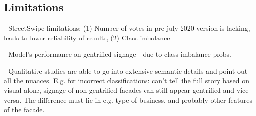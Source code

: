\subsection{Limitations}
- StreetSwipe limitations: (1) Number of votes in pre-july 2020 version is lacking, leads to lower reliability of results, (2) Class imbalance

- Model's performance on gentrified signage - due to class imbalance probs.

- Qualitative studies are able to go into extensive semantic details and point out all the nuances. E.g. for incorrect classifications: can't tell the full story based on visual alone, signage of non-gentrified facades can still appear gentrified and vice versa. The difference must lie in e.g. type of business, and probably other features of the facade.
